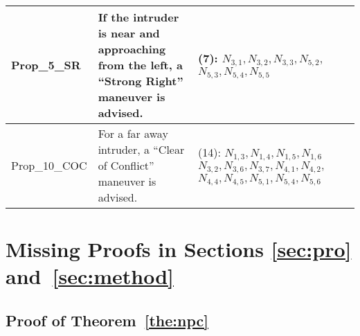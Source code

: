 \begin{table}[h]
{\begin{tabular}{l|l|l}
         Prop\_5\_SR & \tabincell{l}{If the intruder is near and approaching from the left, a \\ ``Strong Right'' maneuver is advised.} & \tabincell{l}{(7): $N_{3,1},N_{3,2},N_{3,3},N_{5,2},$ \\ $N_{5,3},N_{5,4}, N_{5,5}$} \\ \midrule

         
         Prop\_10\_COC & \tabincell{l}{For a far away intruder, a ``Clear of Conflict'' maneuver is \\ advised.} & \tabincell{l}{(14): $N_{1,3},N_{1,4},N_{1,5},N_{1,6}$\\ $N_{3,2},N_{3,6},N_{3,7},N_{4,1},N_{4,2},$ \\ $N_{4,4},N_{4,5},N_{5,1},N_{5,4},N_{5,6}$} \\ 
        
        \bottomrule
    \end{tabular}}
    \label{tab:bench_C}
\end{table}

\section{Missing Proofs in Sections \ref{sec:pro} and~\ref{sec:method}}

\subsection{Proof of Theorem~\ref{the:npc}}

